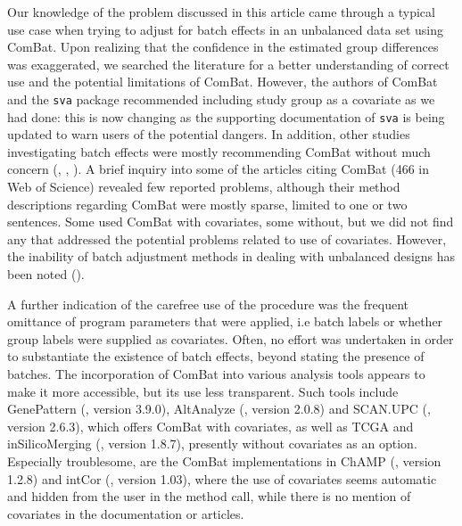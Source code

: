 \documentclass{bio}
\begin{document}
Our knowledge of the problem discussed in this article came through a typical use case when trying to adjust for batch effects in an unbalanced data set using ComBat. Upon realizing that the confidence in the estimated group differences was exaggerated, we searched the literature for a better understanding of correct use and the potential limitations of ComBat. However, the authors of ComBat and the \texttt{sva} package recommended including study group as a covariate as we had done: this is now changing as the supporting documentation of \texttt{sva} is being updated to warn users of the potential dangers. In addition, other studies investigating batch effects were mostly recommending ComBat without much concern (\citealp{Kupfer2012}, \citealp{Kitchen2011}, \citealp{Chen2011}). A brief inquiry into some of the articles citing ComBat (466 in Web of Science) revealed few reported problems, although their method descriptions regarding ComBat were mostly sparse, limited to one or two sentences. Some used ComBat with covariates, some without, but we did not find any that addressed the potential problems related to use of covariates. However, the inability of batch adjustment methods in dealing with unbalanced designs has been noted (\citealp{Buhule2014}).

A further indication of the carefree use of the procedure was the frequent omittance of program parameters that were applied, i.e batch labels or whether group labels were supplied as covariates. Often, no effort was undertaken in order to substantiate the existence of batch effects, beyond stating the presence of batches. The incorporation of ComBat into various analysis tools appears to make it more accessible, but its use less transparent. Such tools include GenePattern (\citealp{Reich2006}, version 3.9.0), AltAnalyze (\citealp{Emig2010}, version 2.0.8) and SCAN.UPC (\citealp{Piccolo2013}, version 2.6.3), which offers ComBat with covariates, as well as TCGA and  inSilicoMerging (\citealp{ Taminau2012}, version 1.8.7), presently without covariates as an option. Especially troublesome, are the ComBat implementations in ChAMP (\citealp{Morris2014}, version 1.2.8) and intCor (\citealp{Fernandez-Albert2014}, version 1.03), where the use of covariates seems automatic and hidden from the user in the method call, while there is no mention of covariates in the documentation or articles.
\end{document}
